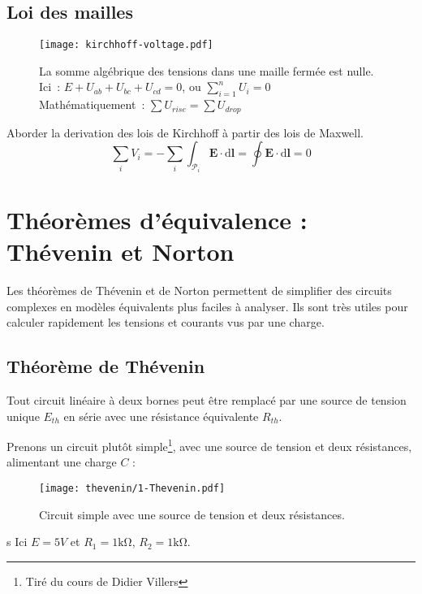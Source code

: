 \subsection{Loi des mailles} \label{subsec:mailles}
\begin{figure}[H]
    \centering
    \texttt{[image: kirchhoff-voltage.pdf]}
    \caption[Loi des mailles.]{
        La somme algébrique des tensions dans une maille fermée est nulle.\\
        Ici~: \(E+U_{ab}+U_{bc}+U_{cd}=0\), ou \(\displaystyle\sum_{i=1}^nU_i=0\)\\
        \vspace{\baselineskip}
        Mathématiquement~: \(\displaystyle\sum U_{rise} = \displaystyle\sum U_{drop}\)
    }
    \label{fig:kirchhoff-voltage}%
\end{figure}
\begin{Todo}
	Aborder la derivation des lois de Kirchhoff \`a partir des lois de Maxwell.
	\[\sum_i V_i = - \sum_i \int_{\mathcal{P}_i}\mathbf{E}\cdot\mathrm{d}\mathbf{l} = \oint\mathbf{E}\cdot\mathrm{d}\mathbf{l} = 0\]
\end{Todo}

\section{Théorèmes d'équivalence : Thévenin et Norton} \label{subsec:thevenin_norton}

Les théorèmes de Thévenin et de Norton permettent de simplifier des circuits
complexes en modèles équivalents plus faciles à analyser. Ils sont très utiles
pour calculer rapidement les tensions et courants vus par une charge.

\subsection{Théorème de Thévenin}

Tout circuit linéaire à deux bornes peut être remplacé par une source de tension
unique \(E_{th}\) en série avec une résistance équivalente \(R_{th}\).

Prenons un circuit plut\^ot simple\footnote{Tir\'e du cours de Didier Villers},
avec une source de tension et deux r\'esistances, alimentant une charge \(C\) :

\begin{figure}[H]
    \centering
    \texttt{[image: thevenin/1-Thevenin.pdf]}
    \caption{Circuit simple avec une source de tension et deux r\'esistances.}
\end{figure}s
Ici \(E=5V\) et \(R_1=1\unit{\kilo\ohm}\), \(R_2=1\unit{\kilo\ohm}\).\\

